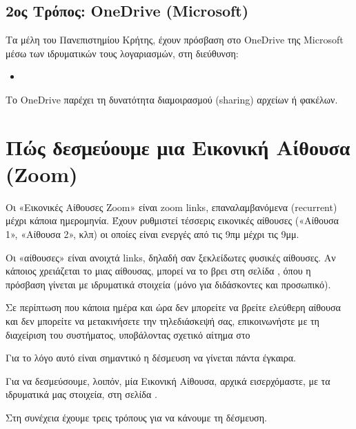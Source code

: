 \documentclass[letterpaper,10pt,greek]{sphinxhowto}
\begin{document}
\subsection{2ος Τρόπος: OneDrive (Microsoft)}
\label{\detokenize{HowToTransfer:onedrive-microsoft}}
\sphinxAtStartPar
Τα μέλη του Πανεπιστημίου Κρήτης, έχουν πρόσβαση στο OneDrive της Microsoft
μέσω των ιδρυματικών τους λογαριασμών, στη διεύθυνση:
\begin{itemize}
\item {} 
\sphinxAtStartPar
{}

\end{itemize}

\sphinxAtStartPar
Το OneDrive παρέχει τη δυνατότητα διαμοιρασμού (sharing) αρχείων ή φακέλων.

\sphinxstepscope


\section{Πώς δεσμεύουμε μια Εικονική Αίθουσα (Zoom)}
\label{\detokenize{HowToZoom:zoom}}\label{\detokenize{HowToZoom::doc}}
\sphinxAtStartPar
Οι «Εικονικές Αίθουσες Zoom» είναι zoom links, επαναλαμβανόμενα (recurrent)
μέχρι κάποια ημερομηνία. Έχουν ρυθμιστεί τέσσερις εικονικές αίθουσες («Αίθουσα 1», «Αίθουσα 2», κλπ)
οι οποίες είναι ενεργές από τις 9πμ μέχρι τις 9μμ.

\sphinxAtStartPar
Οι «αίθουσες» είναι ανοιχτά links, δηλαδή σαν ξεκλείδωτες φυσικές  αίθουσες.
Αν κάποιος χρειάζεται το  μιας αίθουσας, μπορεί να το βρει στη σελίδα ,
όπου η πρόσβαση γίνεται με ιδρυματικά στοιχεία (μόνο για διδάσκοντες και προσωπικό).

\sphinxAtStartPar
Σε περίπτωση που κάποια ημέρα και ώρα δεν μπορείτε να βρείτε ελεύθερη αίθουσα και
δεν μπορείτε να μετακινήσετε την τηλεδιάσκεψή σας, επικοινωνήστε με τη διαχείριση
του συστήματος, υποβάλοντας σχετικό αίτημα στο 

\sphinxAtStartPar
Για το λόγο αυτό είναι σημαντικό η δέσμευση να γίνεται πάντα έγκαιρα.

\sphinxAtStartPar
Για να δεσμεύσουμε, λοιπόν, μία Εικονική Αίθουσα, αρχικά εισερχόμαστε,
με τα ιδρυματικά μας στοιχεία, στη σελίδα .

\sphinxAtStartPar
Στη συνέχεια έχουμε τρεις τρόπους για να κάνουμε τη δέσμευση.
\end{document}
